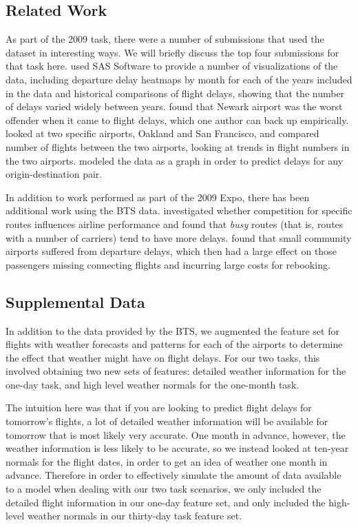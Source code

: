 \documentclass[twocolumn]{article}
\begin{document}
\subsection{Related Work}

As part of the 2009 task, there were a number of submissions that used the dataset in interesting ways. We will briefly discuss the top four submissions for that task here.
\cite{wicklin2009congestion} used SAS Software to provide a number of visualizations of the data, including departure delay heatmaps by month for each of the years included in the data and historical comparisons of flight delays, showing that the number of delays varied widely between years.
\cite{hofmann2011delayed} found that Newark airport was the worst offender when it came to flight delays, which one author can back up empirically.
\cite{wickham2011tale} looked at two specific airports, Oakland and San Francisco, and compared number of flights between the two airports, looking at trends in flight numbers in the two airports.
\cite{dey2009minimizing} modeled the data as a graph in order to predict delays for any origin-destination pair.

In addition to work performed as part of the 2009 Expo, there has been additional work using the BTS data.
\cite{rupp2006does} investigated whether competition for specific routes influences airline performance and found that \emph{busy} routes (that is, routes with a number of carriers) tend to have more delays.
\cite{stone2015investigating} found that small community airports suffered from departure delays, which then had a large effect on those passengers missing connecting flights and incurring large costs for rebooking.


\subsection{Supplemental Data}

In addition to the data provided by the BTS, we augmented the feature set for flights with weather forecasts and patterns for each of the airports to determine the effect that weather might have on flight delays.
For our two tasks, this involved obtaining two new sets of features: detailed weather information for the one-day task, and high level weather normals for the one-month task.

The intuition here was that if you are looking to predict flight delays for tomorrow's flights, a lot of detailed weather information will be available for tomorrow that is most likely very accurate.
One month in advance, however, the weather information is less likely to be accurate, so we instead looked at ten-year normals for the flight dates, in order to get an idea of weather one month in advance.
Therefore in order to effectively simulate the amount of data available to a model when dealing with our two task scenarios, we only included the detailed flight information in our one-day feature set, and only included the high-level weather normals in our thirty-day task feature set.
\end{document}
